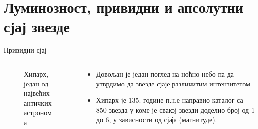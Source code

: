 \documentclass[aspectratio=169, xcolor=table, 10pt]{beamer}
\theoremstyle{definition}
\begin{document}
\section{Луминозност, привидни и апсолутни сјај звезде}

\begin{frame}{Привидни сјај}
  \begin{columns}[T]
    \begin{column}{0.35\textwidth}
      \begin{figure}
        \centering
        \captionsetup{width=\wd0}
        \caption{Хипарх, један од највећих античких астронома}
      \end{figure}
    \end{column}
    \begin{column}{0.65\textwidth}
      \begin{itemize}
        \item Довољан је један поглед на ноћно небо па да утврдимо да звезде сјаје различитим интензитетом.
        \item Хипарх је 135. године п.н.е направио каталог са 850 звезда у коме је свакој звезди доделио број од 1 до 6, у зависности од сјаја (магнитуде).

\end{itemize}
\end{column}
\end{columns}
\end{frame}
\end{document}
